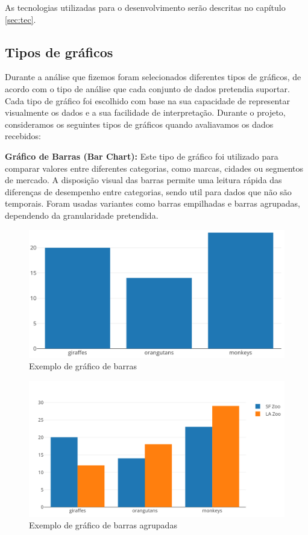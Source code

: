 As tecnologias utilizadas para o desenvolvimento serão descritas no capítulo \ref{sec:tec}.

\subsection{Tipos de gráficos}

Durante a análise que fizemos foram selecionados diferentes tipos de gráficos, de acordo com o tipo de análise que cada conjunto de dados pretendia suportar. Cada tipo de gráfico foi escolhido com base na sua capacidade de representar visualmente os dados e a sua facilidade de interpretação. Durante o projeto, consideramos os seguintes tipos de gráficos quando avaliavamos os dados recebidos:

\textbf{Gráfico de Barras (Bar Chart):}
Este tipo de gráfico foi utilizado para comparar valores entre diferentes categorias, como marcas, cidades ou segmentos de mercado. A disposição visual das barras permite uma leitura rápida das diferenças de desempenho entre categorias, sendo util para dados que não são temporais. Foram usadas variantes como barras empilhadas e barras agrupadas, dependendo da granularidade pretendida.

\begin{figure}[H]
\centering
\includegraphics[max width=12cm, keepaspectratio]{./img/barras1}
\caption{Exemplo de gráfico de barras}
\end{figure}
\noindent

\begin{figure}[H]
\centering
\includegraphics[max width=12cm, keepaspectratio]{./img/agrupada}
\caption{Exemplo de gráfico de barras agrupadas}
\end{figure}
\noindent

